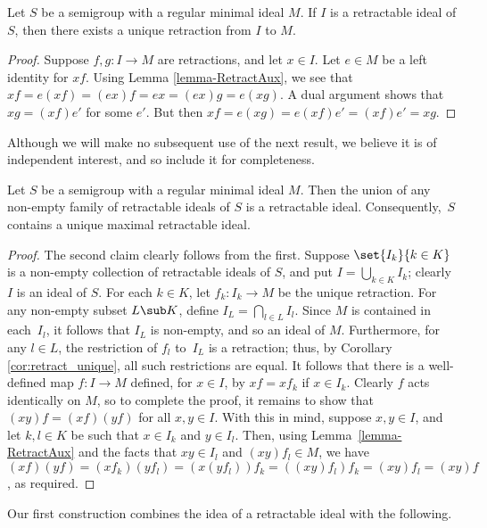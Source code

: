 \begin{corollary}\label{cor:retract_unique}
Let $S$ be a semigroup with a regular minimal ideal $M$.  If $I$ is a retractable ideal of $S$, then there exists a unique retraction from $I$ to $M$.
\end{corollary}

\begin{proof}
Suppose $f,g:I\to M$ are retractions, and let $x\in I$.  Let $e\in M$ be a
left identity for $xf$.  Using Lemma \ref{lemma-RetractAux}, we see that
$xf = e (xf) = (ex)f = ex = (ex)g = e (xg)$.  A dual argument shows that
$xg=(xf) e'$ for some $e'$.  But then $xf = e (xg) = e (xf)  e' = (xf)e'=xg$.
\end{proof}

Although we will make no subsequent use of the next result, we believe it is of independent interest, and so include it for completeness.


\begin{proposition}
Let $S$ be a semigroup with a regular minimal ideal $M$.  Then the union of any non-empty family of retractable ideals of $S$ is a retractable ideal.  Consequently,~$S$ contains a unique maximal retractable ideal.
\end{proposition}

\begin{proof} The second claim clearly follows from the first.  Suppose $\set{I_k}{k\in K}$ is a non-empty collection of retractable ideals of $S$, and put $I=\bigcup_{k\in K}I_k$; clearly $I$ is an ideal of $S$.  For each $k\in K$, let $f_k:I_k\to M$ be the unique retraction.  For any non-empty subset $L\sub K$, define $I_L=\bigcap_{l\in L}I_l$.  Since $M$ is contained in each~$I_l$, it follows that $I_L$ is non-empty, and so an ideal of $M$.  Furthermore, for any $l\in L$, the restriction of $f_l$ to~$I_L$ is a retraction; thus, by Corollary \ref{cor:retract_unique}, all such restrictions are equal.  It follows that there is a well-defined map $f:I\to M$ defined, for $x\in I$, by $xf=xf_k$ if $x\in I_k$.  Clearly $f$ acts identically on $M$, so to complete the proof, it remains to show that $(xy)f=(xf)(yf)$ for all $x,y\in I$.  With this in mind, suppose $x,y\in I$, and let $k,l\in K$ be such that $x\in I_k$ and $y\in I_l$.  Then, using Lemma~\ref{lemma-RetractAux} and the facts that $xy\in I_l$ and $(xy)f_l\in M$, we have $(xf)(yf) = (xf_k)(yf_l) = (x(yf_l))f_k = ((xy)f_l)f_k = (xy)f_l = (xy)f$, as required.
\end{proof}

Our first construction combines the idea of a retractable ideal with the following.

